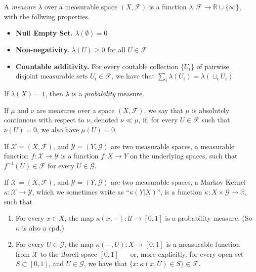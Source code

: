\documentclass[twoside]{article} %
\theoremstyle{plain}
\theoremstyle{definition}
\begin{document}
    \begin{defn}[Measure]
        A \emph{measure} $\lambda$ over a measurable space $(X, \mathcal F)$ is a function $\lambda : \mathcal F \to \mathbb R \cup \{\infty\}$, with the follwing properties.
        \begin{itemize}[itemsep=0pt]
            \item \textbf{Null Empty Set.} $\lambda(\emptyset) = 0$
            \item \textbf{Non-negativity.} $\lambda(U) \ge 0$ for all $U \in \mathcal F$
            \item \textbf{Countable additivity.} For every coutable collection $\{U_i\}$ of pairwise disjoint measurable sets $U_i \in \mathcal F$, we have that
             $\sum_{i} \lambda(U_i) = \lambda(\sqcup_i U_i)$
        \end{itemize}
        If  $\lambda(X) = 1$, then $\lambda$ is a \emph{probability} measure. 
    \end{defn}
    
    \begin{defn}
        If $\mu$ and $\nu$ are measures over a space $(X, \mathcal F)$, 
        we say that $\mu$ is absolutely continuous with respect to $\nu$, denoted $\nu \ll \mu$, if, for every $U \in \mathcal F$ such that $\nu(U) = 0$, we also have $\mu(U) = 0$. 
    \end{defn}
    
    \begin{defn}
        If $\mathcal X  = (X, \mathcal F)$, and $\mathcal Y = (Y, \mathcal G)$ are two measurable spaces, a measurable function $f : \mathcal X \to \mathcal Y$ is a function $f: X \to Y$ on the underlying spaces, such that 
        $f^{-1}(U) \in \mathcal F$ for every $U \in \mathcal G$.
    \end{defn}
    
    \begin{defn}
        If $\mathcal X  = (X, \mathcal F)$, and $\mathcal Y = (Y, \mathcal G)$ are two measurable spaces, a Markov Kernel $\kappa : \mathcal X \to \mathcal Y$, which we sometimes write as ``$\kappa(Y|X)$'', is a function $\kappa : X \times \mathcal G \to \mathbb R$, such that
        \begin{enumerate}
            \item For every $x \in X$, the map $\kappa(x, -) : \mathcal U \to [0,1]$ is a probability measure. (So $\kappa$ is also a cpd.)
            \item For every $U \in \mathcal G$, the map $\kappa(-, U) : X \to [0,1]$ is a measurable function from $\mathcal X$ to the Borell space $[0,1]$
            --- or, more explicitly, for every open set $S \subset [0,1]$, and $U \in \mathcal G$, we have that
            $\{x : \kappa(x,U) \in S\} \in \mathcal F$. 
    \end{enumerate}
    \end{defn}
    
\end{document}
